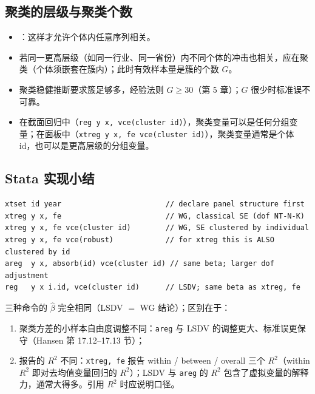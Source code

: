 \subsection{聚类的层级与聚类个数}

\begin{itemize}
  \item {}：这样才允许个体内任意序列相关。
  \item 若同一更高层级（如同一行业、同一省份）内不同个体的冲击也相关，应在聚类（个体须嵌套在簇内）；此时有效样本量是簇的个数 $G$。
  \item 聚类稳健推断要求簇足够多，经验法则 $G\ge30$（第 5 章）；$G$ 很少时标准误不可靠。
  \item 在截面回归中（\texttt{reg y x, vce(cluster id)}），聚类变量可以是任何分组变量；在面板中（\texttt{xtreg y x, fe vce(cluster id)}），聚类变量通常是个体 id，也可以是更高层级的分组变量。
\end{itemize}

\subsection{Stata 实现小结}

\noindent\begin{minipage}{\linewidth}
\begin{lstlisting}
xtset id year                        // declare panel structure first
xtreg y x, fe                        // WG, classical SE (dof NT-N-K)
xtreg y x, fe vce(cluster id)        // WG, SE clustered by individual
xtreg y x, fe vce(robust)            // for xtreg this is ALSO clustered by id
areg  y x, absorb(id) vce(cluster id) // same beta; larger dof adjustment
reg   y x i.id, vce(cluster id)      // LSDV; same beta as xtreg, fe
\end{lstlisting}
\end{minipage}
三种命令的 $\hat\beta$ 完全相同（LSDV $=$ WG 结论）；区别在于：
\begin{enumerate}[label=(\roman*)]
  \item 聚类方差的小样本自由度调整不同：\texttt{areg} 与 LSDV 的调整更大、标准误更保守（Hansen 第 17.12--17.13 节）；
  \item 报告的 $R^2$ 不同：\texttt{xtreg, fe} 报告 within / between / overall 三个 $R^2$（within $R^2$ 即对去均值变量回归的 $R^2$）；LSDV 与 \texttt{areg} 的 $R^2$ 包含了虚拟变量的解释力，通常大得多。引用 $R^2$ 时应说明口径。
\end{enumerate}

